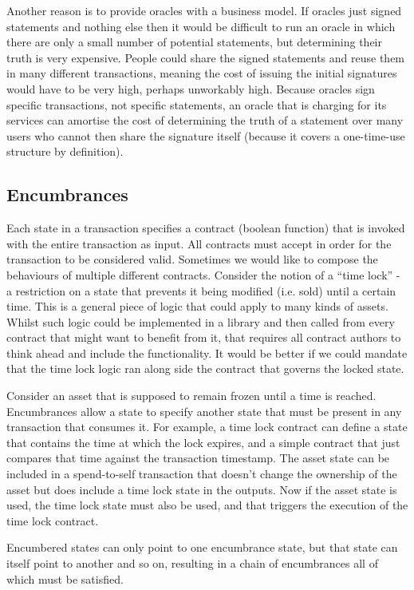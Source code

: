 \documentclass{article}
\begin{document}
Another reason is to provide oracles with a business model. If oracles just signed statements and nothing else then
it would be difficult to run an oracle in which there are only a small number of potential statements, but
determining their truth is very expensive. People could share the signed statements and reuse them in many different
transactions, meaning the cost of issuing the initial signatures would have to be very high, perhaps
unworkably high. Because oracles sign specific transactions, not specific statements, an oracle that is charging
for its services can amortise the cost of determining the truth of a statement over many users who cannot then
share the signature itself (because it covers a one-time-use structure by definition).

\subsection{Encumbrances}

Each state in a transaction specifies a contract (boolean function) that is invoked with the entire transaction as input. All contracts must accept
in order for the transaction to be considered valid. Sometimes we would like to compose the behaviours of multiple
different contracts. Consider the notion of a ``time lock'' - a restriction on a state that prevents it being
modified (i.e. sold) until a certain time. This is a general piece of logic that could apply to many kinds of
assets. Whilst such logic could be implemented in a library and then called from every contract that might want
to benefit from it, that requires all contract authors to think ahead and include the functionality. It would be
better if we could mandate that the time lock logic ran along side the contract that governs the locked state.

Consider an asset that is supposed to remain frozen until a time is reached. Encumbrances allow a state to specify another
state that must be present in any transaction that consumes it. For example, a time lock contract can define a state that
contains the time at which the lock expires, and a simple contract that just compares that time against the transaction
timestamp. The asset state can be included in a spend-to-self transaction that doesn't change the ownership of the asset
but does include a time lock state in the outputs. Now if the asset state is used, the time lock state must also be used, and
that triggers the execution of the time lock contract.

Encumbered states can only point to one encumbrance state, but that state can itself point to another and so on,
resulting in a chain of encumbrances all of which must be satisfied.
\end{document}
